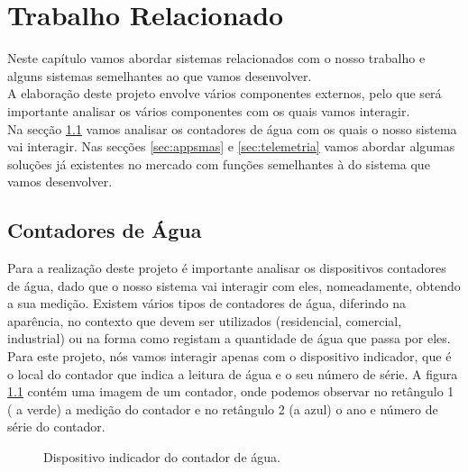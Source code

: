 %
%
\chapter{Trabalho Relacionado} \label{cap:trabrelacionado}
Neste capítulo vamos abordar sistemas relacionados com o nosso trabalho e alguns sistemas semelhantes ao que vamos desenvolver.\\
A elaboração deste projeto envolve vários componentes externos, pelo que será importante analisar os vários componentes com os quais vamos interagir.\\
Na secção \ref{sec:cont} vamos analisar os contadores de água com os quais o nosso sistema vai interagir. Nas secções \ref{sec:appsmas} e \ref{sec:telemetria} vamos abordar algumas soluções já existentes no mercado com funções semelhantes à do sistema que vamos desenvolver.

\section{Contadores de Água} \label{sec:cont}
Para a realização deste projeto é importante analisar os dispositivos contadores de água, dado que o nosso sistema vai interagir com eles, nomeadamente, obtendo a sua medição.
Existem vários tipos de contadores de água, diferindo na aparência, no contexto que devem ser utilizados (residencial, comercial, industrial) ou na forma como registam a quantidade de água que passa por eles. Para este projeto, nós vamos interagir apenas com o dispositivo indicador, que é o local do contador que indica a leitura de água e o seu número de série.
A figura \ref{fig:contador} contém uma imagem de um contador, onde podemos observar no retângulo 1 ( a verde) a medição do contador e no retângulo 2 (a azul) o ano e número de série do contador.

\begin{figure}[h!]
\begin{center}
\caption{Dispositivo indicador do contador de água.}
\label{fig:contador}
\end{center}
\end{figure}


